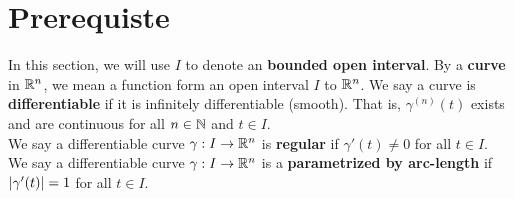 \documentclass{report}
\begin{document}
\section{Prerequiste}
\begin{mdframed}
In this section, we will use $I$ to denote an \textbf{bounded open interval}. By a \textbf{curve} in $\mathbb{R}^n$, we mean a function form an open interval $I$ to $\mathbb{R}^n$.  We say a curve is \textbf{differentiable} if it is infinitely differentiable (smooth). That is, $\gamma ^{(n)}(t)$ exists and are continuous for all $n\in\mathbb{N}$ and $t \in I$.\\

We say a differentiable curve $\gamma  :I\rightarrow \mathbb{R}^n$ is \textbf{regular} if $\gamma '(t)\neq 0$ for all $t  \in I$. We say a differentiable curve $\gamma :I\rightarrow \mathbb{R}^n$ is a \textbf{parametrized by arc-length} if $\left|\gamma '(t)\right|=1$ for all $t \in I$. 
\end{mdframed}
\end{document}
